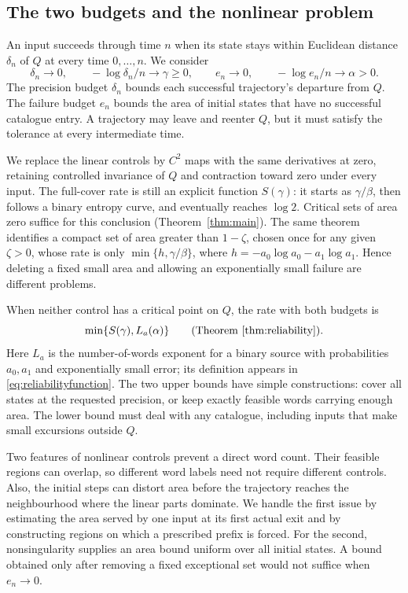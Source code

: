 \documentclass[11pt]{amsart}
\theoremstyle{definition}
\theoremstyle{remark}
\numberwithin{equation}{section}
\begin{document}
\subsection{The two budgets and the nonlinear problem}
An input succeeds through time $n$ when its state stays within
Euclidean distance $\delta_n$ of $Q$ at every time $0,\ldots,n$.
We consider
\[
\delta_n\to0,\qquad -\log\delta_n/n\to\gamma\ge0,
\qquad e_n\to0,\qquad -\log e_n/n\to\alpha>0.
\]
The precision budget $\delta_n$ bounds each successful trajectory's
departure from $Q$. The failure budget $e_n$ bounds the area of
initial states that have no successful catalogue entry. A trajectory
may leave and reenter $Q$, but it must satisfy the tolerance at
every intermediate time.

We replace the linear controls by $C^2$ maps with the same
derivatives at zero, retaining controlled invariance of $Q$ and
contraction toward zero under every input. The full-cover rate is
still an explicit function $S(\gamma)$: it starts as $\gamma/\beta$,
then follows a binary entropy curve, and eventually reaches $\log2$.
Critical sets of area zero suffice for this conclusion
(Theorem~\ref{thm:main}). The same theorem identifies a compact
set of area greater than $1-\zeta$, chosen once for any given
$\zeta>0$, whose rate is only $\min\{h,\gamma/\beta\}$, where
$h=-a_0\log a_0-a_1\log a_1$. Hence deleting a fixed small area
and allowing an exponentially small failure are different problems.

When neither control has a critical point on $Q$, the rate with
both budgets is
\[
\min\{S(\gamma),L_a(\alpha)\}
\qquad\text{(Theorem~\ref{thm:reliability}).}
\]
Here $L_a$ is the number-of-words exponent for a binary source
with probabilities $a_0,a_1$ and exponentially small error; its
definition appears in \eqref{eq:reliabilityfunction}. The two upper
bounds have simple constructions: cover all states at the requested
precision, or keep exactly feasible words carrying enough area.
The lower bound must deal with any catalogue, including inputs
that make small excursions outside $Q$.

Two features of nonlinear controls prevent a direct word count.
Their feasible regions can overlap, so different word labels need
not require different controls. Also, the initial steps can distort
area before the trajectory reaches the neighbourhood where the
linear parts dominate. We handle the first issue by estimating
the area served by one input at its first actual exit and by
constructing regions on which a prescribed prefix is forced.
For the second, nonsingularity supplies an area bound uniform over
all initial states. A bound obtained only after removing a fixed
exceptional set would not suffice when $e_n\to0$.
\end{document}
